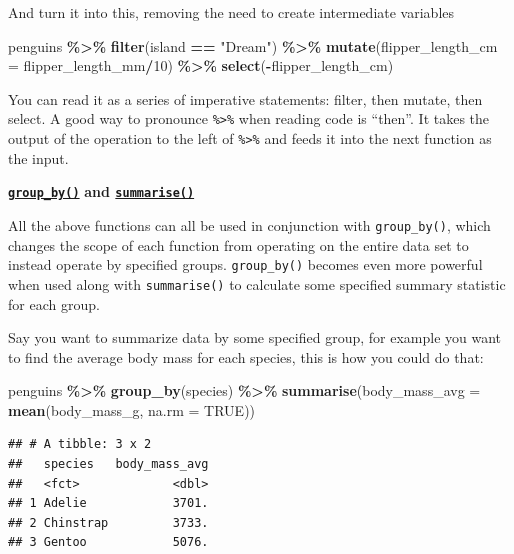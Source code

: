 \documentclass[
]{book}
\newenvironment{Shaded}{\begin{snugshade}}{\end{snugshade}}
\newcommand{\AttributeTok}[1]{\textcolor[rgb]{0.13,0.29,0.53}{#1}}
\newcommand{\ConstantTok}[1]{\textcolor[rgb]{0.56,0.35,0.01}{#1}}
\newcommand{\DecValTok}[1]{\textcolor[rgb]{0.00,0.00,0.81}{#1}}
\newcommand{\FunctionTok}[1]{\textcolor[rgb]{0.13,0.29,0.53}{\textbf{#1}}}
\newcommand{\NormalTok}[1]{#1}
\newcommand{\SpecialCharTok}[1]{\textcolor[rgb]{0.81,0.36,0.00}{\textbf{#1}}}
\newcommand{\StringTok}[1]{\textcolor[rgb]{0.31,0.60,0.02}{#1}}
\begin{document}
And turn it into this, removing the need to create intermediate variables

\begin{Shaded}
\begin{Highlighting}[]
\NormalTok{penguins }\SpecialCharTok{\%\textgreater{}\%} 
  \FunctionTok{filter}\NormalTok{(island }\SpecialCharTok{==} \StringTok{"Dream"}\NormalTok{) }\SpecialCharTok{\%\textgreater{}\%} 
  \FunctionTok{mutate}\NormalTok{(}\AttributeTok{flipper\_length\_cm =}\NormalTok{ flipper\_length\_mm}\SpecialCharTok{/}\DecValTok{10}\NormalTok{) }\SpecialCharTok{\%\textgreater{}\%} 
  \FunctionTok{select}\NormalTok{(}\SpecialCharTok{{-}}\NormalTok{flipper\_length\_cm)}
\end{Highlighting}
\end{Shaded}

You can read it as a series of imperative statements: filter, then mutate, then select. A good way to pronounce \texttt{\%\textgreater{}\%} when reading code is ``then''. It takes the output of the operation to the left of \texttt{\%\textgreater{}\%} and feeds it into the next function as the input.

\href{https://dplyr.tidyverse.org/reference/group_by.html}{\textbf{\texttt{group\_by()}}} \textbf{and \href{https://dplyr.tidyverse.org/reference/summarise.html}{\texttt{summarise()}}}

All the above functions can all be used in conjunction with \texttt{group\_by()}, which changes the scope of each function from operating on the entire data set to instead operate by specified groups. \texttt{group\_by()} becomes even more powerful when used along with \texttt{summarise()} to calculate some specified summary statistic for each group.

Say you want to summarize data by some specified group, for example you want to find the average body mass for each species, this is how you could do that:

\begin{Shaded}
\begin{Highlighting}[]
\NormalTok{penguins }\SpecialCharTok{\%\textgreater{}\%} 
  \FunctionTok{group\_by}\NormalTok{(species) }\SpecialCharTok{\%\textgreater{}\%} 
  \FunctionTok{summarise}\NormalTok{(}\AttributeTok{body\_mass\_avg =} \FunctionTok{mean}\NormalTok{(body\_mass\_g, }\AttributeTok{na.rm =} \ConstantTok{TRUE}\NormalTok{))}
\end{Highlighting}
\end{Shaded}

\begin{verbatim}
## # A tibble: 3 x 2
##   species   body_mass_avg
##   <fct>             <dbl>
## 1 Adelie            3701.
## 2 Chinstrap         3733.
## 3 Gentoo            5076.
\end{verbatim}
\end{document}
